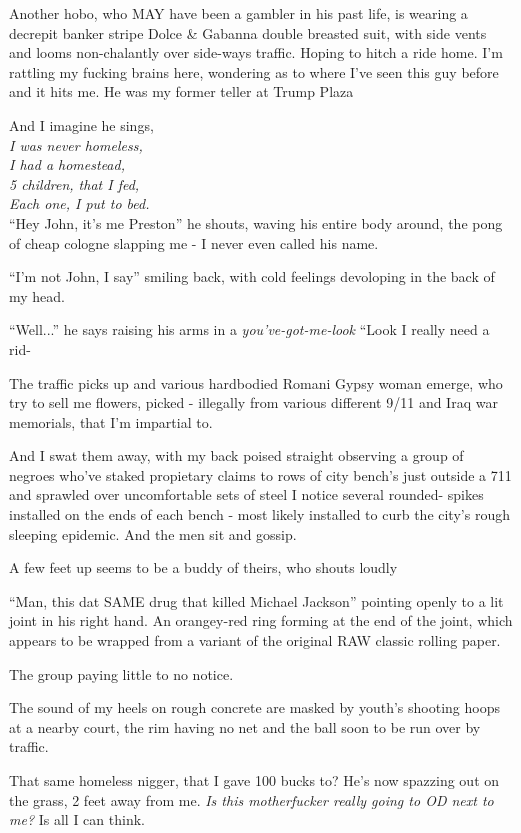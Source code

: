 \documentclass[19pt,openany]{book}
\begin{document}
Another hobo, who MAY have
been a gambler in his past life,
is wearing a decrepit banker stripe
Dolce \& Gabanna double breasted
suit, with side vents and looms
non-chalantly over side-ways traffic.
Hoping to hitch a ride home. I'm rattling
my fucking brains here, wondering
as to where I've seen this guy before
and it hits me. He was my former
teller at Trump Plaza

And I imagine he sings,\\
\textit{
	I was never homeless,\\
	I had a homestead,\\
	5 children, that I fed,\\
	Each one, I put to bed.\\
}
``Hey John, it's me Preston'' he shouts, waving
his entire body around, the pong of
cheap cologne slapping me - I never even called his name.

``I'm not John, I say'' smiling back, with cold feelings
devoloping in the back of my head.

``Well...'' he says raising his arms in a \textit{you've-got-me-look}
``Look I really need a rid-

The traffic picks up and
various hardbodied Romani
Gypsy woman emerge, who try
to sell me flowers,
picked - illegally from
various different
9/11 and Iraq war memorials, that I'm impartial to.

And I swat them away,
with my back poised straight
observing a group of negroes
who've staked
propietary claims
to rows of city bench's
just outside a 711
and sprawled over uncomfortable sets
of steel I notice several rounded-
spikes installed on the ends of
each bench - most likely
installed to curb the city's
rough sleeping epidemic. And
the men sit and gossip.

A few feet up seems to be a buddy
of theirs,
who shouts loudly

``Man,
this dat SAME drug that killed Michael
Jackson'' pointing openly
to a lit joint in his right hand. An orangey-red ring forming at the end of the joint,
which appears to be wrapped from a
variant of the original RAW classic
rolling paper.

The group paying little to no notice.

The sound of my heels on rough concrete are masked by
youth's shooting hoops at
a nearby court, the rim having no net and
the ball soon to be run over by traffic.

That same homeless nigger,
that I gave 100 bucks
to? He's now spazzing out on the grass, 2
feet away from me. \textit{Is
this motherfucker really going
to OD next to me?} Is all
I can think.
\end{document}
